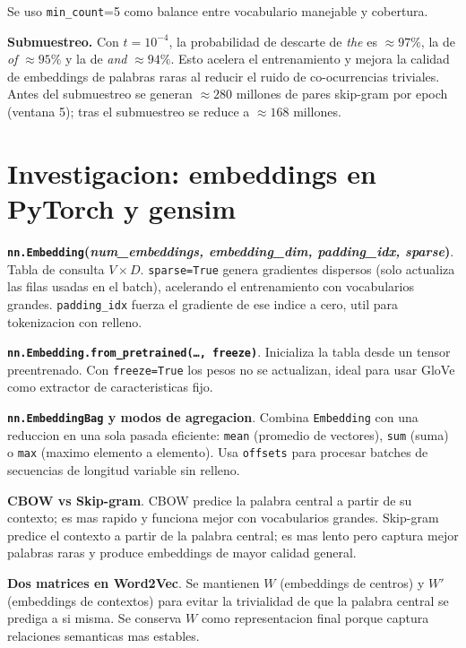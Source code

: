 \documentclass[11pt,a4paper]{article}
\begin{document}
Se uso \texttt{min\_count}=5 como balance entre vocabulario manejable y cobertura.

\textbf{Submuestreo.} Con $t = 10^{-4}$, la probabilidad de descarte de
\textit{the} es $\approx 97\%$, la de \textit{of} $\approx 95\%$ y la de
\textit{and} $\approx 94\%$. Esto acelera el entrenamiento y mejora la calidad
de embeddings de palabras raras al reducir el ruido de co-ocurrencias triviales.
Antes del submuestreo se generan $\approx 280$ millones de pares skip-gram por
epoch (ventana 5); tras el submuestreo se reduce a $\approx 168$ millones.

\section{Investigacion: embeddings en PyTorch y gensim}

\textbf{\texttt{nn.Embedding}(\textit{num\_embeddings, embedding\_dim, padding\_idx, sparse})}.
Tabla de consulta $V \times D$. \texttt{sparse=True} genera gradientes dispersos
(solo actualiza las filas usadas en el batch), acelerando el entrenamiento con
vocabularios grandes. \texttt{padding\_idx} fuerza el gradiente de ese indice a
cero, util para tokenizacion con relleno.

\textbf{\texttt{nn.Embedding.from\_pretrained(\ldots, freeze)}}.
Inicializa la tabla desde un tensor preentrenado. Con \texttt{freeze=True} los
pesos no se actualizan, ideal para usar GloVe como extractor de caracteristicas fijo.

\textbf{\texttt{nn.EmbeddingBag} y modos de agregacion}. Combina \texttt{Embedding}
con una reduccion en una sola pasada eficiente: \texttt{mean} (promedio de vectores),
\texttt{sum} (suma) o \texttt{max} (maximo elemento a elemento). Usa \texttt{offsets}
para procesar batches de secuencias de longitud variable sin relleno.

\textbf{CBOW vs Skip-gram}. CBOW predice la palabra central a partir de su contexto;
es mas rapido y funciona mejor con vocabularios grandes. Skip-gram predice el contexto
a partir de la palabra central; es mas lento pero captura mejor palabras raras y
produce embeddings de mayor calidad general.

\textbf{Dos matrices en Word2Vec}. Se mantienen $W$ (embeddings de centros) y $W'$
(embeddings de contextos) para evitar la trivialidad de que la palabra central se
prediga a si misma. Se conserva $W$ como representacion final porque captura
relaciones semanticas mas estables.
\end{document}

